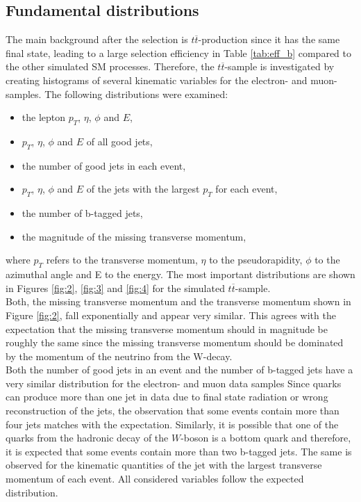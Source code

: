 \subsection{Fundamental distributions} \label{sec:sekunde}
The main background after the selection is $t \overline{t}$-production since it has the same final state, leading to a large selection efficiency
in Table \ref{tab:eff_b} compared to the other simulated SM processes.
Therefore, the $t \overline{t}$-sample is investigated by creating
histograms of several kinematic variables for the electron- and muon-samples.
The following distributions were examined:
\begin{itemize}
  \item the lepton $p_T$, $\eta$, $\phi$ and $E$,
  \item $p_T$, $\eta$, $\phi$ and $E$ of all good jets,
  \item the number of good jets in each event,
  \item $p_T$, $\eta$, $\phi$ and $E$ of the jets with the largest $p_T$ for each event,
  \item the number of b-tagged jets,
  \item the magnitude of the missing transverse momentum,
\end{itemize}
where $p_T$ refers to the transverse momentum, $\eta$ to the pseudorapidity, $\phi$ to the azimuthal angle and E to the energy.
The most important distributions are shown in Figures \ref{fig:2}, \ref{fig:3} and \ref{fig:4} for the simulated $t\overline{t}$-sample. \\
Both, the missing transverse momentum and the transverse momentum shown in Figure \ref{fig:2}, fall exponentially and appear very similar.
This agrees with the expectation that the missing transverse momentum should in magnitude be roughly the same since the missing
transverse momentum should be dominated by the momentum of the neutrino from the W-decay. \\
Both the number of good jets in an event and the number of b-tagged jets have a very similar distribution for the electron- and muon data samples
Since quarks can produce more than one jet in data due to final state radiation or wrong reconstruction of the jets, the observation that some
events contain more than four jets matches with the expectation.
Similarly, it is possible that one of the quarks from the hadronic decay of the $W$-boson is a bottom quark and therefore, it is expected that some events
contain more than two b-tagged jets.
The same is observed for the kinematic quantities of the jet with the largest transverse momentum of each event. All considered variables follow
the expected distribution.

